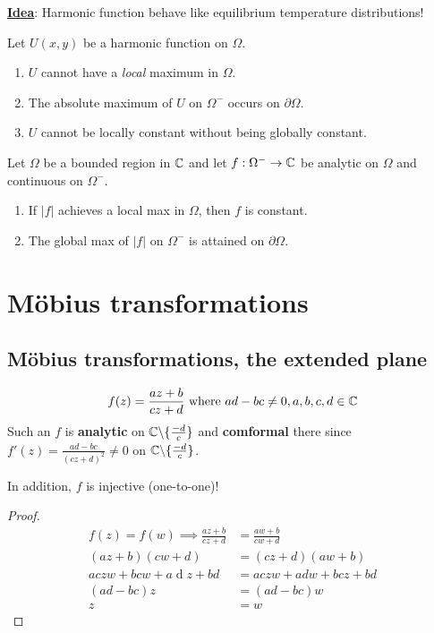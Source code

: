 \documentclass[12pt]{article}
\renewcommand{\d}{\ensuremath{\operatorname{d}}}
\begin{document}
\textbf{\underline{Idea}}: \hypertarget{physics}{Harmonic function behave like equilibrium temperature distributions!}

\begin{proposition}
    Let $U(x,y)$ be a harmonic function on $\Omega$.
    \begin{enumerate}
        \item $U$ cannot have a \textit{local} maximum in $\Omega$.
        \item The absolute maximum of $U$ on $\Omega ^-$ occurs on $\partial \Omega$.
        \item $U$ cannot be locally constant without being globally constant.
    \end{enumerate}
\end{proposition}

\begin{theorem}
    Let $\Omega$ be a bounded region in $\mathbb{C}$ and let $f: \Omega^-\to \mathbb{C}$ be analytic on $\Omega$ and continuous on $\Omega^-$.
    \begin{enumerate}
        \item If $|f|$ achieves a local max in $\Omega$, then $f$ is constant.
        \item The global max of $|f|$ on $\Omega^-$ is attained on $\partial \Omega$.
    \end{enumerate}
\end{theorem}

\section{Möbius transformations}
\subsection{Möbius transformations, the extended plane}
\begin{align*}
    f(z)=\frac{az+b}{cz+d}\text{ where } ad-bc\neq 0, a,b,c,d\in \mathbb{C}
\end{align*}
Such an $f$ is \textbf{analytic} on $\mathbb{C}\backslash\{\frac{-d}{c}\}$ and \textbf{comformal} there since $f'(z)=\frac{ad-bc}{(cz+d)^2}\neq 0$ on $\mathbb{C}\backslash\{\frac{-d}{c}\}$.

\rmk In addition, $f$ is injective (one-to-one)!
\begin{proof}
    \begin{align*}
        f(z)=f(w)\implies \frac{az+b}{cz+d}&=\frac{aw+b}{cw+d}\\
         (az+b)(cw+d)&= (cz+d)(aw+b)\\
         aczw+bcw+a\d z+bd&=aczw+adw+bcz+bd\\
         (ad-bc)z&=(ad-bc)w\\
         z&=w
    \end{align*}
\end{proof}
\end{document}

